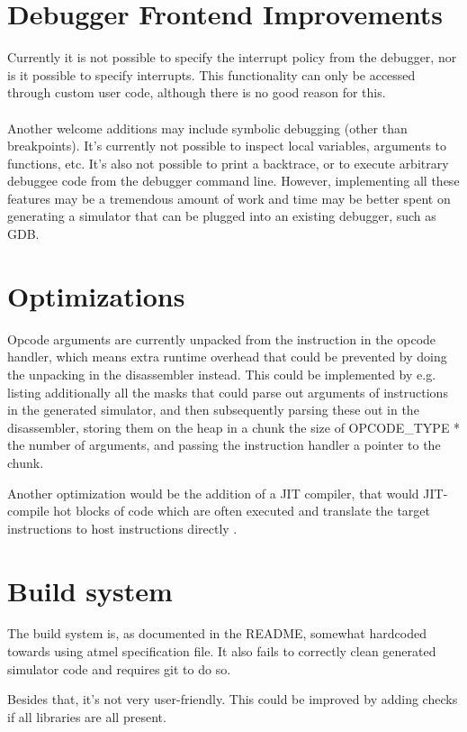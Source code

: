 \section{Debugger Frontend Improvements}
Currently it is not possible to specify the interrupt policy from the
debugger, nor is it possible to specify interrupts. This functionality can
only be accessed through custom user code, although there is no good reason
for this.\\
\\
Another welcome additions may include symbolic debugging (other than
breakpoints). It's currently not possible to inspect local variables,
arguments to functions, etc. It's also not possible to print a backtrace, or
to execute arbitrary debuggee code from the debugger command line. 
However, implementing all these
features may be a tremendous amount of work and time may be better spent on
generating a simulator that can be plugged into an existing debugger, such as
GDB.

\section{Optimizations}
Opcode arguments are currently unpacked from the instruction in the opcode
handler, which means extra runtime overhead that could be prevented by doing
the unpacking in the disassembler instead. This could be implemented by e.g.
listing additionally all the masks that could parse out arguments of
instructions in the generated simulator, and then subsequently parsing these
out in the disassembler, storing them on the heap in a chunk the size of
OPCODE\_TYPE * the number of arguments, and passing the instruction handler a
pointer to the chunk.

Another optimization would be the addition of a JIT compiler, that would
JIT-compile hot blocks of code which are often executed and translate the
target instructions to host instructions directly \cite{JIT}.

\section{Build system}
The build system is, as documented in the README, somewhat hardcoded towards
using atmel specification file. It also fails to correctly clean generated
simulator code and requires git to do so.

Besides that, it's not very user-friendly. This could be improved by adding
checks if all libraries are all present.
